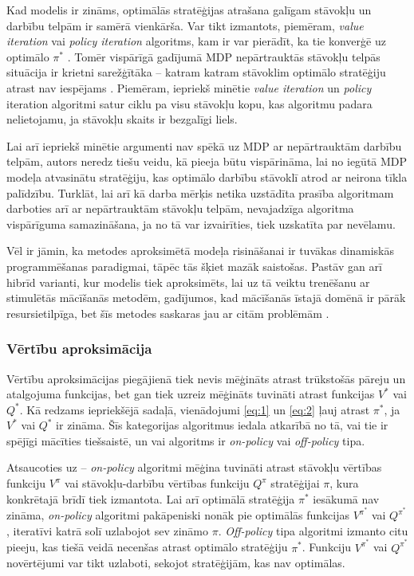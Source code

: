 \documentclass{ludis} %
\begin{document}
Kad modelis ir zināms, optimālās stratēģijas atrašana galīgam stāvokļu un
darbību telpām ir samērā vienkārša. Var tikt izmantots, piemēram, \textit{value
  iteration} vai \textit{policy iteration} algoritms, kam ir var pierādīt, ka
tie konverģē uz optimālo $\pi^*$ \autocite{Barto}. Tomēr vispārīgā gadījumā MDP
nepārtrauktās stāvokļu telpās situācija ir krietni sarežģītāka -- katram katram
stāvoklim optimālo stratēģiju atrast nav iespējams \autocite{Otterlo}. Piemēram,
iepriekš minētie \textit{value iteration} un \textit{policy} iteration algoritmi
satur ciklu pa visu stāvokļu kopu, kas algoritmu padara nelietojamu, ja stāvokļu
skaits ir bezgalīgi liels.


Lai arī iepriekš minētie argumenti nav spēkā uz MDP ar nepārtrauktām darbību
telpām, autors neredz tiešu veidu, kā pieeja būtu vispārināma, lai no iegūtā MDP
modeļa atvasinātu stratēģiju, kas optimālo darbību stāvoklī atrod ar neirona
tīkla palīdzību.
Turklāt, lai arī kā darba mērķis netika uzstādīta prasība algoritmam darboties
arī ar nepārtrauktām stāvokļu telpām, nevajadzīga algoritma vispārīguma
samazināšana, ja no tā var izvairīties, tiek uzskatīta par nevēlamu.

Vēl ir jāmin, ka metodes aproksimētā modeļa risināšanai ir tuvākas dinamiskās
programmēšanas paradigmai, tāpēc tās šķiet mazāk saistošas. Pastāv gan arī
hibrīd varianti, kur modelis tiek aproksimēts, lai uz tā veiktu trenēšanu ar
stimulētās mācīšanās metodēm, gadījumos, kad mācīšanās īstajā domēnā ir pārāk
resursietilpīga, bet šīs metodes saskaras jau ar citām problēmām
\autocite{Hasselt2012}.

\subsubsection{Vērtību aproksimācija}
Vērtību aproksimācijas piegājienā tiek nevis mēģināts atrast trūkstošās pāreju
un atalgojuma funkcijas, bet gan tiek uzreiz mēģināts tuvināti atrast funkcijas
$V^*$ vai $Q^*$. Kā redzams iepriekšējā sadaļā, vienādojumi \eqref{eq:1} un
\eqref{eq:2} ļauj atrast $\pi^*$, ja $V^*$ vai $Q^*$ ir zināma. Šīs kategorijas
algoritmus iedala atkarībā no tā, vai tie ir spējīgi mācīties tiešsaistē, un vai
algoritms ir \textit{on-policy} vai \textit{off-policy} tipa.

Atsaucoties uz \autocite{Hasselt2012} -- \textit{on-policy} algoritmi mēģina
tuvināti atrast stāvokļu vērtības funkciju $V^\pi$ vai stāvokļu-darbību vērtības
funkciju $Q^\pi$ stratēģijai $\pi$, kura konkrētajā brīdī tiek izmantota. Lai
arī optimālā stratēģija $\pi^*$ iesākumā nav zināma, \textit{on-policy}
algoritmi pakāpeniski nonāk pie optimālās funkcijas $V^{\pi^*}$ vai $Q^{\pi^*}$,
iteratīvi katrā solī uzlabojot sev zināmo $\pi$. \textit{Off-policy} tipa
algoritmi izmanto citu pieeju, kas tiešā veidā necenšas atrast optimālo
stratēģiju $\pi^*$. Funkciju $V^{\pi^*}$ vai $Q^{\pi^*}$ novērtējumi var tikt
uzlaboti, sekojot stratēģijām, kas nav optimālas.
\end{document}
